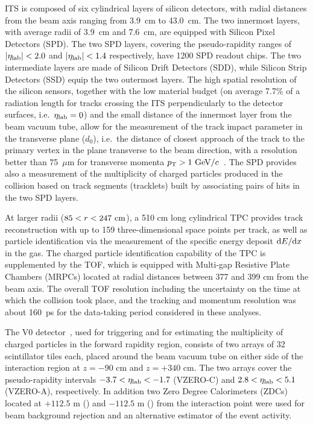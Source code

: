 ITS is composed of six cylindrical layers of silicon detectors, with radial distances from the beam axis ranging from 3.9~cm to 43.0~cm. 
The two innermost layers, with average radii of 3.9~cm and 7.6~cm, are equipped with Silicon Pixel Detectors (SPD). 
The two SPD layers, covering the pseudo-rapidity ranges of $|\eta_{\rm lab}|< 2.0$ and $|\eta_{\rm lab}|< 1.4$ respectively, have 1200 SPD readout chips.  
The two intermediate layers are made of Silicon Drift Detectors (SDD), while Silicon Strip Detectors (SSD) equip the two outermost layers. 
The high spatial resolution of the silicon sensors, together with the low material budget (on average 7.7\% of a radiation length for tracks crossing the ITS perpendicularly to the detector surfaces, i.e.\ $\eta_{\rm lab}=0$) and the small distance of the innermost layer from the beam vacuum tube, allow for the measurement of the track impact parameter in the transverse plane ($d_0$), i.e.\ the distance of closest approach of the track to the primary vertex in the plane transverse to the beam direction, with a resolution better than 75~$\mu$m for transverse momenta $p_{\mathrm{T}}>1~\mathrm{GeV}/c$~\cite{Aamodt:2010aa}.
The SPD provides also a measurement of the multiplicity of charged particles produced in the collision based on track segments (tracklets) built by associating pairs of hits in the two SPD layers.

At larger radii ($85<r<247~\mathrm{cm}$), a 510 cm long cylindrical TPC provides track reconstruction with up to 159 three-dimensional space points per track, as well as particle identification via the measurement of the specific energy deposit ${\rm d}E/{\rm d}x$ in the gas.
The charged particle identification capability of the TPC is supplemented by the TOF, which is equipped with Multi-gap Resistive Plate Chambers  (MRPCs) located at radial distances between 377 and 399 cm from the beam axis. The overall TOF resolution including the uncertainty on the time at which the collision took place, and the tracking and momentum resolution was about 160~ps for the data-taking period considered in these analyses. 

The V0 detector~\cite{Abbas:2013taa}, used for triggering and for estimating the multiplicity of charged particles in the forward rapidity region, consists of two arrays of 32 scintillator tiles each, placed around the beam vacuum tube on either side of the interaction region at $z =-90$ cm and $z=+340$ cm. The two arrays cover the pseudo-rapidity intervals $-3.7 < \eta_{\rm lab} < -1.7$ (VZERO-C) and $2.8 < \eta_{\rm lab} < 5.1$ (VZERO-A), respectively. In addition two Zero Degree Calorimeters (ZDCs) located at $+112.5$ m (\ZNA) and $-112.5$ m (\ZNC) from the interaction point were used for beam background rejection and an alternative estimator of the event activity.

